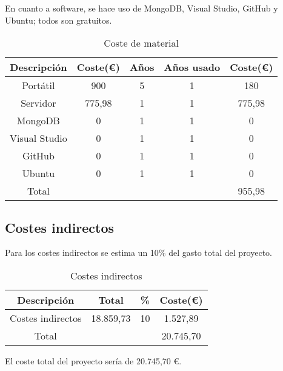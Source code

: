 En cuanto a software, se hace uso de MongoDB, Visual Studio, GitHub y Ubuntu; todos son gratuitos.

\begin{table}[h!]
\centering
\begin{tabular}{|c|c|c|c|c|}
\hline
\textbf{Descripción} & \textbf{Coste(€)} & \textbf{Años} & \textbf{Años usado} & \textbf{Coste(€)} \\
\hline
Portátil & 900 & 5 & 1 & 180 \\
\hline
Servidor & 775,98 & 1 & 1 & 775,98 \\
\hline
MongoDB & 0 & 1 & 1 & 0 \\
\hline
Visual Studio & 0 & 1 & 1 & 0 \\
\hline
GitHub & 0 & 1 & 1 & 0 \\
\hline
Ubuntu & 0 & 1 & 1 & 0 \\
\hline
Total &  & & & 955,98 \\
\hline
\end{tabular}
\caption{Coste de material}
\label{tab:ejemplo}
\end{table}

\subsection*{Costes indirectos}
Para los costes indirectos se estima un 10\% del gasto total del proyecto.
\begin{table}[h!]
\centering
\begin{tabular}{|c|c|c|c|}
\hline
\textbf{Descripción} & \textbf{Total} & \textbf{\%} & \textbf{Coste(€)} \\
\hline
Costes indirectos & 18.859,73 & 10 & 1.527,89 \\
\hline
Total &  &  & 20.745,70 \\
\hline
\end{tabular}
\caption{Costes indirectos}
\label{tab:ejemplo}
\end{table}

El coste total del proyecto sería de 20.745,70 €.